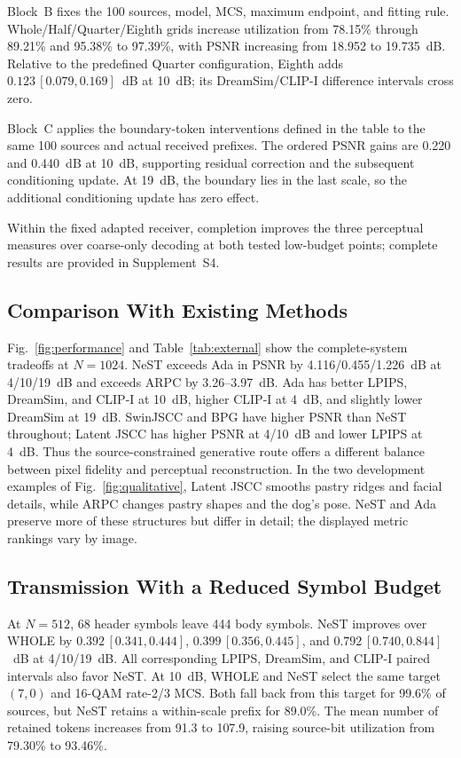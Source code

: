 Block~B fixes the 100 sources, model, MCS, maximum endpoint, and fitting rule. Whole/Half/Quarter/Eighth grids increase utilization from 78.15\% through 89.21\% and 95.38\% to 97.39\%, with PSNR increasing from 18.952 to 19.735~dB. Relative to the predefined Quarter configuration, Eighth adds $0.123\,[0.079,0.169]$~dB at 10~dB; its DreamSim/CLIP-I difference intervals cross zero.

Block~C applies the boundary-token interventions defined in the table to the same 100 sources and actual received prefixes. The ordered PSNR gains are 0.220 and 0.440~dB at 10~dB, supporting residual correction and the subsequent conditioning update. At 19~dB, the boundary lies in the last scale, so the additional conditioning update has zero effect.

Within the fixed adapted receiver, completion improves the three perceptual measures over coarse-only decoding at both tested low-budget points; complete results are provided in Supplement~S4.

\subsection{Comparison With Existing Methods}
\ifCLASSOPTIONonecolumn\fi

Fig.~\ref{fig:performance} and Table~\ref{tab:external} show the complete-system tradeoffs at $N=1024$. NeST exceeds Ada in PSNR by 4.116/0.455/1.226~dB at 4/10/19~dB and exceeds ARPC by 3.26--3.97~dB. Ada has better LPIPS, DreamSim, and CLIP-I at 10~dB, higher CLIP-I at 4~dB, and slightly lower DreamSim at 19~dB. SwinJSCC and BPG have higher PSNR than NeST throughout; Latent JSCC has higher PSNR at 4/10~dB and lower LPIPS at 4~dB. Thus the source-constrained generative route offers a different balance between pixel fidelity and perceptual reconstruction. In the two development examples of Fig.~\ref{fig:qualitative}, Latent JSCC smooths pastry ridges and facial details, while ARPC changes pastry shapes and the dog's pose. NeST and Ada preserve more of these structures but differ in detail; the displayed metric rankings vary by image.

\subsection{Transmission With a Reduced Symbol Budget}

At $N=512$, 68 header symbols leave 444 body symbols. NeST improves over WHOLE by $0.392\,[0.341,0.444]$, $0.399\,[0.356,0.445]$, and $0.792\,[0.740,0.844]$~dB at 4/10/19~dB. All corresponding LPIPS, DreamSim, and CLIP-I paired intervals also favor NeST. At 10~dB, WHOLE and NeST select the same target $(7,0)$ and 16-QAM rate-2/3 MCS. Both fall back from this target for 99.6\% of sources, but NeST retains a within-scale prefix for 89.0\%. The mean number of retained tokens increases from 91.3 to 107.9, raising source-bit utilization from 79.30\% to 93.46\%.

